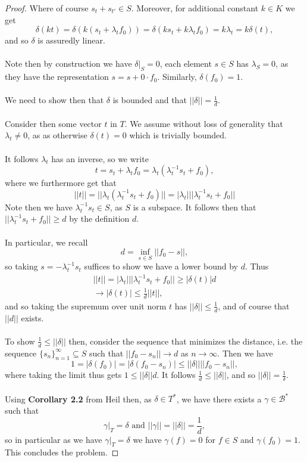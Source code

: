 \documentclass[12pt]{article}
\newenvironment{ex}[2][Exercise]{\begin{trivlist}
\item[\hskip \labelsep {\bfseries #1}\hskip \labelsep {\bfseries #2.}]}{\end{trivlist}}
\begin{document}
\begin{ex}{19}
\begin{proof}
        Where of course $s_t + s_{t'} \in S$. Moreover, for additional constant $k \in K$ we get 
        $$\delta(kt) = \delta(k(s_t + \lambda_tf_0)) = \delta(ks_t + k\lambda_tf_0) = k\lambda_t = k\delta(t),$$
        and so $\delta$ is assuredly linear. \\ \\
        Note then by construction we have $\delta \vert_S = 0$, each element $s \in S$ has $\lambda_S = 0$, as they have the representation $s = s + 0\cdot f_0$. Similarly, $\delta(f_0) = 1$. \\ \\
        We need to show then that $\delta$ is bounded and that $||\delta|| = \frac{1}{d}$. \\ \\
        Consider then some vector $t$ in $T$. We assume without loss of generality that $\lambda_t \neq 0$, as as otherwise $\delta(t) = 0$ which is trivially bounded. \\ \\
        It follows $\lambda_t$ has an inverse, so we write 
        $$t = s_t + \lambda_tf_0 = \lambda_t(\lambda_t^{-1}s_t + f_0),$$
        where we furthermore get that 
        $$||t|| = ||\lambda_t(\lambda_t^{-1}s_t + f_0)|| = |\lambda_t|||\lambda_t^{-1}s_t + f_0||$$
        Note then we have $\lambda_t^{-1}s_t \in S$, as $S$ is a subspace. It follows then that $||\lambda_t^{-1}s_t + f_0|| \geq d$ by the definition $d$. \\ \\
        In particular, we recall 
        $$d = \underset{s \in S}{\inf} ||f_0 - s||,$$
        so taking $s = -\lambda_t^{-1}s_t$ suffices to show we have a lower bound by $d$. Thus 
        \begin{align*}
            ||t|| = |\lambda_t|||\lambda_t^{-1}s_t + f_0|| \geq |\delta(t)|d \\
            \longrightarrow |\delta(t)| \leq \frac{1}{d}||t||,
        \end{align*}
        and so taking the supremum over unit norm $t$ has $||\delta|| \leq \frac{1}{d}$, and of course that $||d||$ exists. \\ \\
        To show $\frac{1}{d} \leq ||\delta||$ then, consider the sequence that minimizes the distance, i.e. the sequence $\{s_n\}_{n = 1}^\infty \subseteq S$ such that $||f_0 - s_n|| \rightarrow d$ as $n \rightarrow \infty$. Then we have 
        $$1 = |\delta(f_0)| = |\delta(f_0 - s_n)| \leq ||\delta||||f_0 - s_n||,$$
        where taking the limit thus gets $1 \leq ||\delta||d$. It follows $\frac{1}{d} \leq ||\delta||$, and so $||\delta|| = \frac{1}{\delta}$. \\ \\
        Using \textbf{Corollary 2.2} from Heil then, as $\delta \in T^*$, we have there exists a $\gamma \in \mathcal{B}^*$ such that 
        $$\gamma \vert_T = \delta \text{ and } ||\gamma|| = ||\delta|| = \frac{1}{d},$$
        so in particular as we have $\gamma \vert_T = \delta$ we have $\gamma(f) = 0$ for $f \in S$ and $\gamma(f_0) = 1$. This concludes the problem. 
    \end{proof}
\end{ex}
\end{document}
